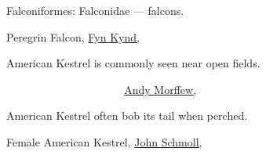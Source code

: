\documentclass[t]{beamer}
\begin{document}
{
\begin{frame}{Falconiformes: Falconidae — falcons.}


\tinyfill Peregrin Falcon, \href{https://flickr.com/photos/79452129@N02/21571335442}{Fyn Kynd, }
\end{frame}
}

{
\begin{frame}{American Kestrel is commonly seen near open fields.}



\tinyfill \textcolor{white}{Male American Kestrel, %
 \href{https://commons.wikimedia.org/wiki/File:American_Kestrel_(Male)_(8238822396).jpg}{Andy Morffew, }}
\end{frame}
}

{
\begin{frame}{American Kestrel often bob its tail when perched.}



\tinyfill Female American Kestrel, %
 \href{https://flickr.com/photos/jls195674/16558905212}{John Schmoll, }
\end{frame}
}
\end{document}

